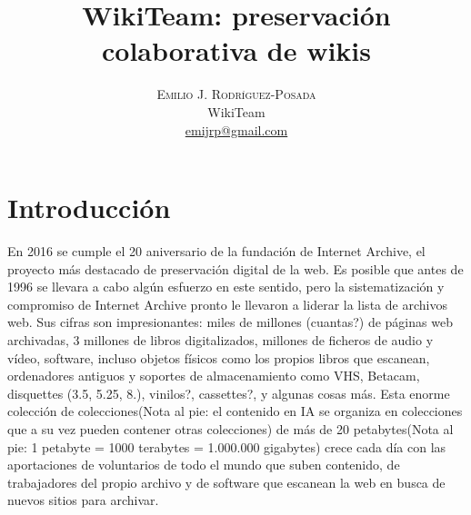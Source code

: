 \documentclass[11pt,twocolumn]{article}
\title{\vspace{-15mm}
	\fontsize{24pt}{10pt}\selectfont
	\textbf{WikiTeam: preservación colaborativa de wikis}
	}
\author{
	\large
	\textsc{Emilio J. Rodríguez-Posada} \\
	\normalsize	WikiTeam \\
	\normalsize	\href{mailto:emijrp@gmail.com}{emijrp@gmail.com}
	\vspace{-5mm}
	}
\date{}
\begin{document}

\section{Introducción}

En 2016 se cumple el 20 aniversario de la fundación de Internet Archive, el proyecto más destacado de preservación digital de la web. Es posible que antes de 1996 se llevara a cabo algún esfuerzo en este sentido, pero la sistematización y compromiso de Internet Archive pronto le llevaron a liderar la lista de archivos web. Sus cifras son impresionantes: miles de millones (cuantas?) de páginas web archivadas, 3 millones de libros digitalizados, millones de ficheros de audio y vídeo, software, incluso objetos físicos como los propios libros que escanean, ordenadores antiguos y soportes de almacenamiento como VHS, Betacam, disquettes (3.5, 5.25, 8.), vinilos?, cassettes?, y algunas cosas más. Esta enorme colección de colecciones(Nota al pie: el contenido en IA se organiza en colecciones que a su vez pueden contener otras colecciones) de más de 20 petabytes(Nota al pie: 1 petabyte = 1000 terabytes = 1.000.000 gigabytes) crece cada día con las aportaciones de voluntarios de todo el mundo que suben contenido, de trabajadores del propio archivo y de software que escanean la web en busca de nuevos sitios para archivar.
\end{document}
